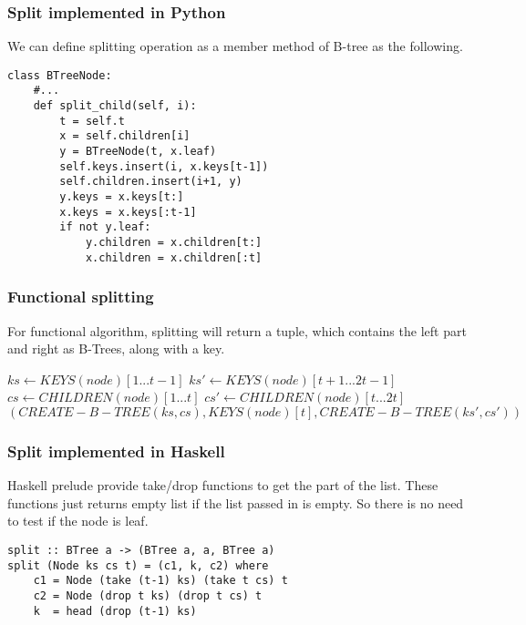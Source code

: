 \documentclass{article}
\begin{document}
\subsubsection*{Split implemented in Python}
We can define splitting operation as a member method of B-tree
as the following.

\lstset{language=Python}
\begin{lstlisting}
class BTreeNode:
    #...
    def split_child(self, i):
        t = self.t
        x = self.children[i]
        y = BTreeNode(t, x.leaf)
        self.keys.insert(i, x.keys[t-1])
        self.children.insert(i+1, y)
        y.keys = x.keys[t:]
        x.keys = x.keys[:t-1]
        if not y.leaf:
            y.children = x.children[t:]
            x.children = x.children[:t]
\end{lstlisting}

\subsubsection{Functional splitting}

For functional algorithm, splitting will return a tuple, which contains the
left part and right as B-Trees, along with a key.

\begin{algorithmic}[1]
  \State $ks \leftarrow KEYS(node)[1 ... t-1]$
  \State $ks' \leftarrow KEYS(node)[t+1 ... 2t-1]$
    \State $cs \leftarrow CHILDREN(node)[1 ... t]$
    \State $cs' \leftarrow CHILDREN(node)[t ... 2t]$
  \EndIf
  \State \Return $(CREATE-B-TREE(ks, cs), KEYS(node)[t], CREATE-B-TREE(ks', cs'))$
\EndFunction
\end{algorithmic}

\subsubsection*{Split implemented in Haskell}
Haskell prelude provide take/drop functions to get the part
of the list. These functions just returns empty list if the
list passed in is empty. So there is no need to test if
the node is leaf.

\lstset{language=Haskell}
\begin{lstlisting}
split :: BTree a -> (BTree a, a, BTree a)
split (Node ks cs t) = (c1, k, c2) where
    c1 = Node (take (t-1) ks) (take t cs) t
    c2 = Node (drop t ks) (drop t cs) t
    k  = head (drop (t-1) ks)
\end{lstlisting}
\end{document}
